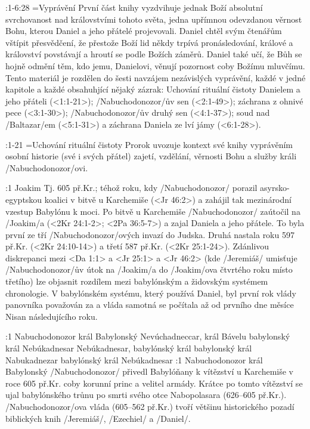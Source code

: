 
:1-6:28 {}={Vyprávění}  První část knihy vyzdvihuje jednak Boží absolutní svrchovanost nad královstvími tohoto světa, jedna upřímnou odevzdanou věrnost Bohu, kterou Daniel a jeho přátelé projevovali.
Daniel chtěl svým čtenářům vštípit přesvědčení, že přestože Boží lid někdy trpívá pronásledování, králové a království povstávají a hroutí se podle Božích záměrů. Daniel také učí, že Bůh se hojně odmění těm, kdo jemu, Danielovi, věnují pozornost coby Božímu mluvčímu. Tento materiál je rozdělen do šesti navzájem nezávislých vyprávění, každé v jedné kapitole a každé obsahuhjící nějaký zázrak:
Uchování rituální čistoty Danielem a jeho přáteli (<1:1-21>); \x/Nabuchodonozor/ův sen (<2:1-49>); záchrana z ohnivé pece (<3:1-30>); \x/Nabuchodonozor/ův druhý sen (<4:1-37>); soud nad \x/Baltazar/em (<5:1-31>) a záchrana Daniela ze lví jámy (<6:1-28>).

:1-21 {}={Uchování rituální čistoty}  Prorok uvozuje kontext své knihy vyprávěním osobní historie (své i svých přátel) zajetí, vzdělání, věrnosti Bohu a služby králi \x/Nabuchodonozor/ovi.

:1 {Joakim}  Tj. 605 př.Kr.; téhož roku, kdy \x/Nabuchodonozor/ porazil  asyrsko-egyptskou koalici v bitvě u Karchemiše (<Jr 46:2>) a zahájil tak mezinárodní vzestup Babylónu k moci. Po bitvě u Karchemiše \x/Nabuchodonozor/ zaútočil na \x/Joakim/a (<2Kr 24:1-2>; <2Pa 36:5-7>) a zajal Daniela a jeho přátele. 
To byla první ze tří \x/Nabuchodonozor/ových  invazí do Judska. Druhá nastala roku 597 př.Kr. (<2Kr 24:10-14>) a třetí 587 př.Kr. (<2Kr 25:1-24>). Zdánlivou diskrepanci mezi <Da 1:1> a <Jr 25:1> a <Jr 46:2> (kde \x/Jeremiáš/ umisťuje \x/Nabuchodonozor/ův útok na \x/Joakim/a do \x/Joakim/ova čtvrtého roku místo třetího) lze objasnit rozdílem mezi babylónským a židovským systémem chronologie. V babylónském systému, který používá Daniel, byl první rok vlády panovníka považován za  a vláda samotná se počítala až od prvního dne měsíce Nisan následujícího roku.

:1  
    {Nabuchodonozor král Babylonský}  %
    {Nevúchadneccar, král Bávelu} %
    {babylonský král Nebúkadnesar}  %
    {Nebúkadnesar, babylónský král} %
    {babylonský král Nabukadnezar}  %
    {babylónský král Nebúkadnesar}  %
:1 {Nabuchodonozor král Babylonský}  \x/Nabuchodonozor/ přivedl Babylóňany k vítězství u Karchemiše v roce 605 př.Kr. coby korunní princ a velitel armády. Krátce po tomto vítězství se ujal babylónského trůnu po smrti svého otce Nabopolasara (626--605 př.Kr.). \x/Nabuchodonozor/ova vláda (605--562 př.Kr.) tvoří většinu historického pozadí  biblických knih \x/Jeremiáš/, \x/Ezechiel/ a \x/Daniel/.     

